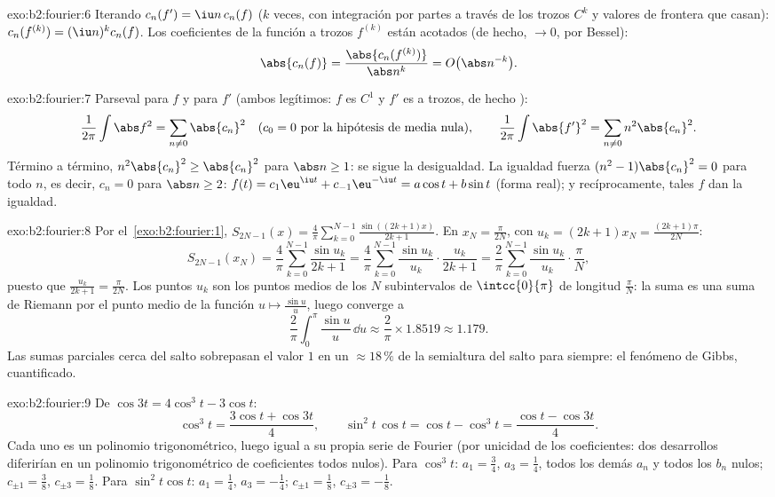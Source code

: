 \begin{solution}{exo:b2:fourier:6}
Iterando $c_n(f') = \iu n\,c_n(f)$ ($k$ veces, con integración por
partes a través de los trozos $C^{k}$ y valores de frontera que
casan): $c_n(f^{(k)}) = (\iu n)^k c_n(f)$. Los coeficientes de la
función  a trozos $f^{(k)}$ están acotados (de hecho, $\to 0$,
por Bessel):
\[
\abs{c_n(f)} = \frac{\abs{c_n(f^{(k)})}}{\abs n^k}
= O\bigl(\abs n^{-k}\bigr) .
\]
\end{solution}

\begin{solution}{exo:b2:fourier:7}
Parseval para $f$ y para $f'$ (ambos legítimos: $f$ es $C^1$ y $f'$
es  a trozos, de hecho ):
\[
\frac{1}{2\pi}\int \abs f^2 = \sum_{n\neq0} \abs{c_n}^2
\quad (c_0 = 0 \text{ por la hipótesis de media nula}),
\qquad
\frac{1}{2\pi}\int \abs{f'}^2 = \sum_{n\neq0} n^2\abs{c_n}^2 .
\]
Término a término, $n^2\abs{c_n}^2 \geq \abs{c_n}^2$ para $\abs n
\geq 1$: se sigue la desigualdad. La igualdad fuerza $(n^2 -
1)\abs{c_n}^2 = 0$ para todo $n$, es decir, $c_n = 0$ para $\abs n
\geq 2$: $f(t) = c_1\eu^{\iu t} + c_{-1}\eu^{-\iu t} = a\cos t +
b\sin t$ (forma real); y recíprocamente, tales $f$ dan la igualdad.
\end{solution}

\begin{solution}{exo:b2:fourier:8}
Por el~\cref{exo:b2:fourier:1}, $S_{2N-1}(x) =
\frac4\pi\sum_{k=0}^{N-1}\frac{\sin((2k+1)x)}{2k+1}$. En $x_N =
\frac{\pi}{2N}$, con $u_k = (2k+1)x_N = \frac{(2k+1)\pi}{2N}$:
\[
S_{2N-1}(x_N) = \frac{4}{\pi}\sum_{k=0}^{N-1}\frac{\sin u_k}{2k+1}
= \frac{4}{\pi}\sum_{k=0}^{N-1}\frac{\sin u_k}{u_k}\cdot
\frac{u_k}{2k+1}
= \frac{2}{\pi}\sum_{k=0}^{N-1}\frac{\sin u_k}{u_k}\cdot
\frac{\pi}{N},
\]
puesto que $\frac{u_k}{2k+1} = \frac{\pi}{2N}$. Los puntos $u_k$ son
los puntos medios de los $N$ subintervalos de $\intcc{0}{\pi}$ de
longitud $\frac{\pi}{N}$: la suma es una suma de Riemann por el punto
medio de la función  $u \mapsto \frac{\sin u}{u}$, luego
converge a
\[
\frac{2}{\pi}\int_0^\pi \frac{\sin u}{u}\,\dd u
\approx \frac{2}{\pi}\times 1.8519 \approx 1.179 .
\]
Las sumas parciales cerca del salto sobrepasan el valor $1$ en un
$\approx 18\,\%$ de la semialtura del salto para siempre: el fenómeno
de Gibbs, cuantificado.
\end{solution}

\begin{solution}{exo:b2:fourier:9}
De $\cos 3t = 4\cos^3t - 3\cos t$:
\[
\cos^3 t = \frac{3\cos t + \cos 3t}{4},
\qquad
\sin^2t\,\cos t = \cos t - \cos^3 t
= \frac{\cos t - \cos 3t}{4} .
\]
Cada uno es un polinomio trigonométrico, luego igual a su propia
serie de Fourier (por unicidad de los coeficientes: dos desarrollos
diferirían en un polinomio trigonométrico de coeficientes todos
nulos). Para $\cos^3t$: $a_1 = \frac34$, $a_3 = \frac14$, todos los
demás $a_n$ y todos los $b_n$ nulos; $c_{\pm1} = \frac38$, $c_{\pm3}
= \frac18$. Para $\sin^2t\cos t$: $a_1 = \frac14$, $a_3 = -\frac14$;
$c_{\pm1} = \frac18$, $c_{\pm3} = -\frac18$.
\end{solution}

